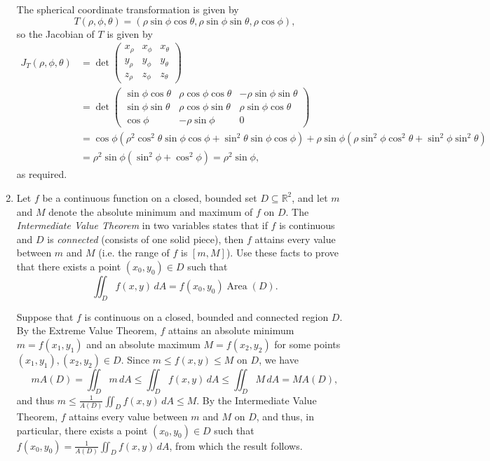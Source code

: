 \documentclass[12pt]{article}
\newcommand{\points}[1]{\marginpar{\hspace{24pt}[#1]}}
\newcommand{\di}{\displaystyle}
\DeclareMathOperator{\area}{Area}
\begin{document}
\begin{enumerate}
The spherical coordinate transformation is given by 
\[   
T(\rho,\phi,\theta) = (\rho\sin\phi\cos\theta,\rho\sin\phi\sin\theta,\rho\cos\phi),
\]
so the Jacobian of $T$ is given by
\begin{align*}
 J_T(\rho,\phi,\theta) &= \det\begin{pmatrix}
                              x_\rho&x_\phi& x_\theta\\y_\rho&y_\phi&y_\theta\\z_\rho&z_\phi&z_\theta
                             \end{pmatrix}\\
& = \det\begin{pmatrix}
         \sin\phi\cos\theta& \rho\cos\phi\cos\theta& -\rho\sin\phi\sin\theta\\ \sin\phi\sin\theta& \rho\cos\phi\sin\theta& \rho\sin\phi\cos\theta\\ \cos\phi & -\rho\sin\phi & 0
        \end{pmatrix}\\
& = \cos\phi(\rho^2\cos^2\theta\sin\phi\cos\phi+\sin^2\theta\sin\phi\cos\phi)+\rho
\sin\phi(\rho\sin^2\phi\cos^2\theta+\sin^2\phi\sin^2\theta)\\
& = \rho^2\sin\phi(\sin^2\phi+\cos^2\phi) = \rho^2\sin\phi,
\end{align*}
as required.

\newpage

\item Let $f$ be a continuous function on a closed, bounded set $D\subseteq \mathbb{R}^2$, and let $m$ and $M$ denote the absolute minimum and maximum of $f$ on $D$. The {\em Intermediate Value Theorem} in two variables states that if $f$ is continuous and $D$ is {\em connected} (consists of one solid piece), then $f$ attains every value between $m$ and $M$ (i.e. the range of $f$ is $[m,M]$). Use these facts to prove that there exists a point $(x_0,y_0)\in D$ such that\points{4}
\[
\iint_D f(x,y)\,dA = f(x_0,y_0)\area(D). 
\]
 
\bigskip

Suppose that $f$ is continuous on a closed, bounded and connected region $D$. By the Extreme Value Theorem, $f$ attains an absolute minimum $m = f(x_1,y_1)$ and an absolute maximum $M=f(x_2,y_2)$ for some points $(x_1,y_1), (x_2,y_2)\in D$. Since $m\leq f(x,y)\leq M$ on $D$, we have
\[
 mA(D) = \iint_D m\, dA\leq \iint_D f(x,y)\,dA \leq \iint_D M\, dA = MA(D),
\]
and thus $\di m\leq \frac{1}{A(D)}\iint_D f(x,y)\, dA \leq M$. By the Intermediate Value Theorem, $f$ attains every value between $m$ and $M$ on $D$, and thus, in particular, there exists a point $(x_0,y_0)\in D$ such that $\di f(x_0,y_0) = \frac{1}{A(D)}\iint_D f(x,y)\,dA$, from which the result follows.

\end{enumerate}
\end{document}
